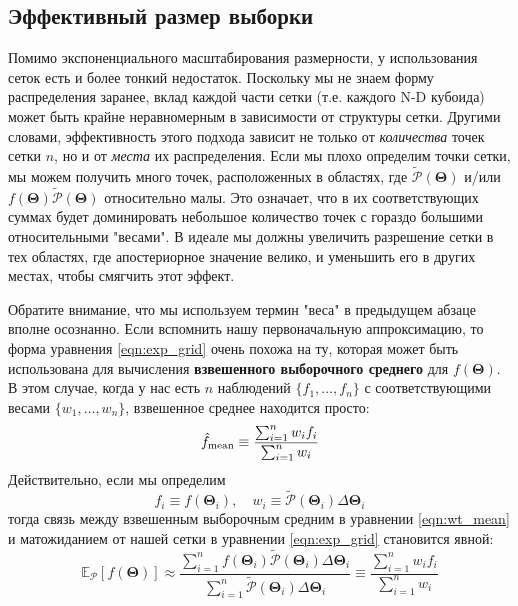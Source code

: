 \documentclass[12pt, titlepage]{article}
\newcommand{\meanwrt}[2]{\ensuremath{\mathbb{E}_{{#2}}\left[{#1}\right]}}
\newcommand{\params}{\ensuremath{\boldsymbol\Theta}}
\newcommand{\posterior}{\ensuremath{\mathcal{P}}}
\begin{document}
\subsection{Эффективный размер выборки} \label{subsec:ess}

Помимо экспоненциального масштабирования размерности, у использования сеток есть и более тонкий недостаток. Поскольку мы не знаем форму распределения заранее, вклад каждой части сетки (т.е. каждого N-D кубоида) может быть крайне неравномерным в зависимости от структуры сетки. Другими словами, эффективность этого подхода зависит не только от \textit{количества} точек сетки $n$, но и от \textit{места} их распределения. Если мы плохо определим точки сетки, мы можем получить много точек, расположенных в областях, где $\tilde{\posterior}(\params)$ и/или $f(\params)\tilde{\posterior}(\params)$ относительно малы. Это означает, что в их соответствующих суммах будет доминировать небольшое количество точек с гораздо большими относительными "весами". В идеале мы должны увеличить разрешение сетки в тех областях, где апостериорное значение велико, и уменьшить его в других местах, чтобы смягчить этот эффект. 

Обратите внимание, что мы используем термин "веса" в предыдущем абзаце вполне осознанно. Если вспомнить нашу первоначальную аппроксимацию, то форма уравнения \eqref{eqn:exp_grid} очень похожа на ту, которая может быть использована для вычисления \textbf{взвешенного выборочного среднего} для $f(\params)$. В этом случае, когда у нас есть $n$ наблюдений $\{ f_1, \dots, f_n \}$ с соответствующими весами $\{ w_1, \dots, w_n \}$, взвешенное среднее находится просто:
\begin{equation} \label{eqn:wt_mean}
    \hat{f}_{\rm mean} \equiv \frac{\sum_{i=1}^{n} w_i f_i}
    {\sum_{i=1}^{n} w_i}
\end{equation}
Действительно, если мы определим
\begin{equation}
    f_i \equiv f(\params_i),
    \quad 
    w_i \equiv \tilde{\posterior}(\params_i) \Delta \params_i
\end{equation}
тогда связь между взвешенным выборочным средним в уравнении \eqref{eqn:wt_mean} и матожиданием от нашей сетки в уравнении \eqref{eqn:exp_grid} становится явной:
\begin{equation}
    \meanwrt{f(\params)}{\posterior}
    \approx \frac{\sum_{i=1}^{n} f(\params_i) 
    \tilde{\posterior}(\params_i) \Delta \params_i}
    {\sum_{i=1}^{n} \tilde{\posterior}(\params_i) \Delta \params_i}
    \equiv \frac{\sum_{i=1}^{n} w_i f_i}
    {\sum_{i=1}^{n} w_i}
\end{equation}
\end{document}
